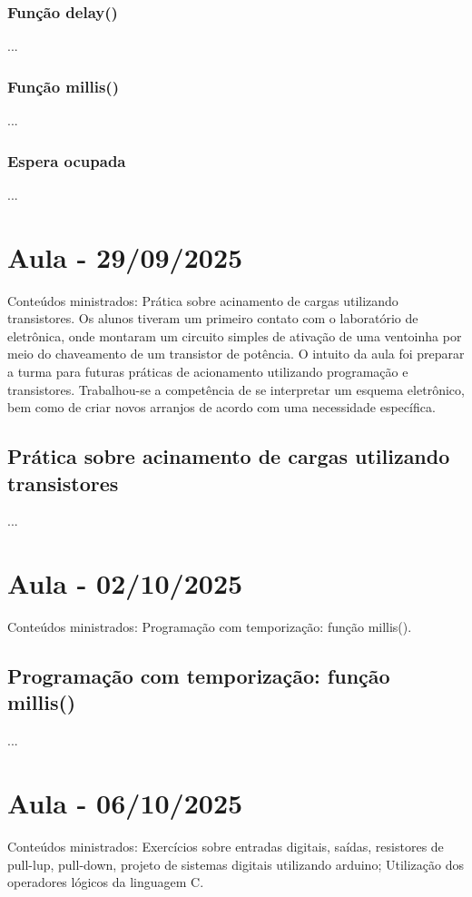 \documentclass{article}
\begin{document}
\subsubsection{Função delay()}
...

\subsubsection{Função millis()}
...

\subsubsection{Espera ocupada}
...


\section{Aula - 29/09/2025}
Conteúdos ministrados: Prática sobre acinamento de cargas utilizando transistores. Os alunos tiveram um primeiro contato com o laboratório de eletrônica, onde montaram um circuito simples de ativação de uma ventoinha por meio do chaveamento de um transistor de potência. O intuito da aula foi preparar a turma para futuras práticas de acionamento utilizando programação e transistores. Trabalhou-se a competência de se interpretar um esquema eletrônico, bem como de criar novos arranjos de acordo com uma necessidade específica.

\subsection{Prática sobre acinamento de cargas utilizando transistores}
...

\section{Aula - 02/10/2025}
Conteúdos ministrados: Programação com temporização: função millis().

\subsection{Programação com temporização: função millis()}
...

\section{Aula - 06/10/2025}
Conteúdos ministrados: Exercícios sobre entradas digitais, saídas, resistores de pull-lup, pull-down, projeto de sistemas digitais utilizando arduino; Utilização dos operadores lógicos da linguagem C.
\end{document}
